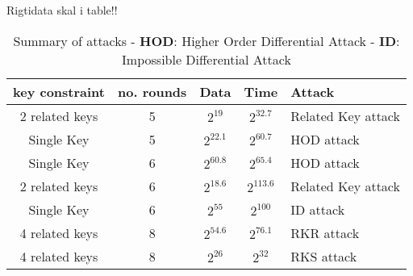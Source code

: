 Rigtidata skal i table!!
\begin{table}[H]
  \centering

  \begin{tabular}{ccccl}
    \hline
    \multicolumn{1}{|l|}{key constraint} & \multicolumn{1}{l|}{no. rounds} & \multicolumn{1}{l|}{Data} & \multicolumn{1}{l|}{Time} & \multicolumn{1}{l|}{Attack}            \\ \hline
    2 related keys                       & 5                               & $2^{19}$                  & $2^{32.7}$                & \multicolumn{1}{c}{Related Key attack} \\ \hline
    Single Key                           & 5                               & $2^{22.1}$                & $2^{60.7}$                & HOD attack                             \\ \hline
    Single Key                           & 6                               & $2^{60.8}$                & $2^{65.4}$                & HOD attack                             \\ \hline
    2 related keys                       & 6                               & $2^{18.6}$                & $2^{113.6}$               & Related Key attack                     \\ \hline
    Single Key                           & 6                               & $2^{55}$                  & $2^{100}$                 & ID attack                              \\ \hline
    4 related keys                       & 8                               & $2^{54.6}$                  & $2^{76.1}$               & RKR attack                     \\ \hline
    4 related keys                       & 8                               & $2^{26}$                  & $2^{32}$                  & RKS attack
  \end{tabular}
  \captionsetup{justification=centering}
  \caption[justification=centering]{Summary of attacks - \textbf{HOD}: Higher Order
    Differential Attack - \textbf{ID}: Impossible Differential Attack}
  \label{tab:kasumiattacks}
\end{table}


